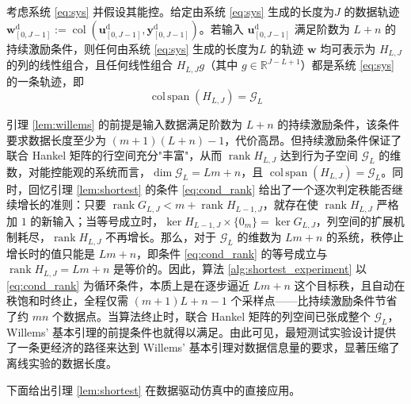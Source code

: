 \begin{lemma}
	考虑系统 \eqref{eq:sys} 并假设其能控。给定由系统 \eqref{eq:sys} 生成的长度为\( J \) 的数据轨迹 \( \mathbf{w}^{\mathrm{d}}_{[0,J-1]} := \operatorname{col}(\mathbf{u}^{\mathrm{d}}_{[0,J-1]}, \mathbf{y}^{\mathrm{d}}_{[0,J-1]}) \)。若输入 \( \mathbf{u}^{\mathrm{d}}_{[0,J-1]} \) 满足阶数为 \( L + n \) 的持续激励条件，则任何由系统 \eqref{eq:sys} 生成的长度为\( L \) 的轨迹 $\mathbf{w}$ 均可表示为 \( H_{L,J} \) 的列的线性组合，且任何线性组合 \( H_{L,J}g \)（其中 \( g \in \mathbb{R}^{J-L+1} \)）都是系统 \eqref{eq:sys} 的一条轨迹，即
	\begin{equation}
		\operatorname{col\,span}(H_{L,J}) = \mathcal{G}_L
		\label{eq:willems}
	\end{equation}
	\label{lem:willems}
\end{lemma}

引理 \ref{lem:willems} 的前提是输入数据满足阶数为 $L + n$ 的持续激励条件，该条件要求数据长度至少为 $(m+1)(L+n)-1$，代价高昂。但持续激励条件保证了联合 Hankel 矩阵的行空间充分"丰富"，从而 $\operatorname{rank} H_{L,J}$ 达到行为子空间 $\mathcal{G}_L$ 的维数，对能控能观的系统而言，$\dim \mathcal{G}_L = Lm + n$，且 $\operatorname{col\,span}(H_{L,J}) = \mathcal{G}_L$。同时，回忆引理 \ref{lem:shortest} 的条件 \eqref{eq:cond_rank} 给出了一个逐次判定秩能否继续增长的准则：只要 $\operatorname{rank} G_{L,J} < m + \operatorname{rank} H_{L-1,J}$，就存在使 $\operatorname{rank} H_{L,J}$ 严格加 $1$ 的新输入；当等号成立时，$\ker H_{L-1,J} \times \{0_m\} = \ker G_{L,J}$，列空间的扩展机制耗尽，$\operatorname{rank} H_{L,J}$ 不再增长。那么，对于 $\mathcal{G}_L$ 的维数为 $Lm + n$ 的系统，秩停止增长时的值只能是 $Lm + n$，即条件 \eqref{eq:cond_rank} 的等号成立与 $\operatorname{rank} H_{L,J} = Lm + n$ 是等价的。因此，算法 \ref{alg:shortest_experiment} 以 \eqref{eq:cond_rank} 为循环条件，本质上是在逐步逼近 $Lm + n$ 这个目标秩，且自动在秩饱和时终止，全程仅需 $(m+1)L + n - 1$ 个采样点——比持续激励条件节省了约 $mn$ 个数据点。当算法终止时，联合 Hankel 矩阵的列空间已张成整个 $\mathcal{G}_L$，Willems' 基本引理的前提条件也就得以满足。由此可见，最短测试实验设计提供了一条更经济的路径来达到 Willems' 基本引理对数据信息量的要求，显著压缩了离线实验的数据长度。

下面给出引理 \ref{lem:shortest} 在数据驱动仿真中的直接应用。

